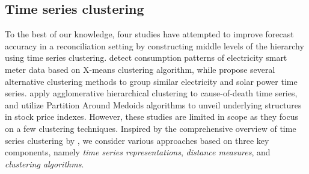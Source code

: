 \documentclass[a4paper,review,12pt,authoryear]{elsarticle}
\begin{document}
\subsection{Time series clustering} 
\label{sec:clustering}


To the best of our knowledge, four studies have attempted to improve forecast accuracy in a reconciliation setting by constructing middle levels of the hierarchy using time series clustering.
\cite{pangHierarchicalElectricityTime2018} detect consumption patterns of electricity smart meter data based on X-means clustering algorithm, while \cite{pangHierarchicalElectricityTime2022} propose several alternative clustering methods to group similar electricity and solar power time series. 
\cite{liForecastReconciliationApproach2019} apply agglomerative hierarchical clustering to cause-of-death time series, and
\cite{matteraImprovingOutofSampleForecasts2023} utilize Partition Around Medoids algorithms to unveil underlying structures in stock price indexes. 
However, these studies are limited in scope as they focus on a few  clustering techniques. 
Inspired by the comprehensive overview of time series clustering by \cite{aghabozorgiTimeseriesClusteringDecade2015a}, we consider various approaches based on three key components, namely \textit{time series representations}, \textit{distance measures}, and \textit{clustering algorithms}. %
\end{document}

